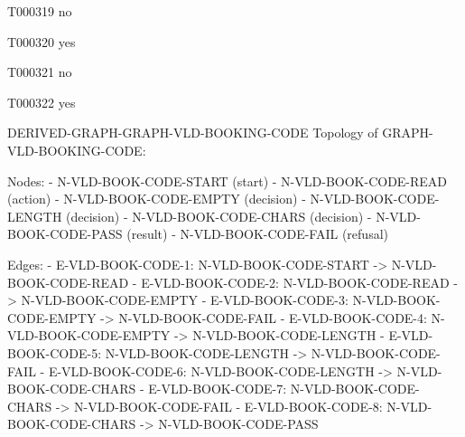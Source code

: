 \documentclass[11pt,a4paper]{article}
\begin{document}
\begin{atlastext}{T000319}
no
\end{atlastext}
\begin{atlastext}{T000320}
yes
\end{atlastext}
\begin{atlastext}{T000321}
no
\end{atlastext}
\begin{atlastext}{T000322}
yes
\end{atlastext}
\par\noindent\begin{minipage}{\linewidth}
\begin{atlasderived}{DERIVED-GRAPH-GRAPH-VLD-BOOKING-CODE}
Topology of GRAPH-VLD-BOOKING-CODE:

Nodes:
- N-VLD-BOOK-CODE-START (start)
- N-VLD-BOOK-CODE-READ (action)
- N-VLD-BOOK-CODE-EMPTY (decision)
- N-VLD-BOOK-CODE-LENGTH (decision)
- N-VLD-BOOK-CODE-CHARS (decision)
- N-VLD-BOOK-CODE-PASS (result)
- N-VLD-BOOK-CODE-FAIL (refusal)

Edges:
- E-VLD-BOOK-CODE-1: N-VLD-BOOK-CODE-START -> N-VLD-BOOK-CODE-READ
- E-VLD-BOOK-CODE-2: N-VLD-BOOK-CODE-READ -> N-VLD-BOOK-CODE-EMPTY
- E-VLD-BOOK-CODE-3: N-VLD-BOOK-CODE-EMPTY -> N-VLD-BOOK-CODE-FAIL
- E-VLD-BOOK-CODE-4: N-VLD-BOOK-CODE-EMPTY -> N-VLD-BOOK-CODE-LENGTH
- E-VLD-BOOK-CODE-5: N-VLD-BOOK-CODE-LENGTH -> N-VLD-BOOK-CODE-FAIL
- E-VLD-BOOK-CODE-6: N-VLD-BOOK-CODE-LENGTH -> N-VLD-BOOK-CODE-CHARS
- E-VLD-BOOK-CODE-7: N-VLD-BOOK-CODE-CHARS -> N-VLD-BOOK-CODE-FAIL
- E-VLD-BOOK-CODE-8: N-VLD-BOOK-CODE-CHARS -> N-VLD-BOOK-CODE-PASS
\end{atlasderived}
\end{minipage}\par
\end{document}
